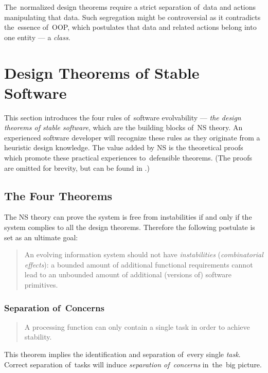 \documentclass[thesis=M,english,hidelinks]{FITthesis}[2012/10/20]
\begin{document}
The~normalized design theorems require a strict separation of~data and actions manipulating that data. Such segregation might be controversial as it contradicts the~essence of~\acrfull{OOP}, which postulates that data and related actions belong into one entity --- a \textit{class}.

% 
% 
\section{Design Theorems of Stable Software}
\label{sec:theorems}
This section introduces the four rules of~software evolvability --- \textit{the design theorems of stable software}, which are the building blocks of~\acrshort{NS} theory. An experienced software developer will recognize these rules as they originate from a heuristic design knowledge. The value added by \acrshort{NS} is the theoretical proofs which promote these practical experiences to~defensible theorems. (The proofs are omitted for brevity, but can be found in \cite{ns-recreating, ns-toward-general-theory}.)

\subsection{The Four Theorems}
The \acrshort{NS} theory can prove the system is free from instabilities if and only if the system complies to all the design theorems. Therefore the following postulate is set as an ultimate goal:
\begin{quote}
    An evolving information system should not have \textit{instabilities} (\textit{combinatorial effects}): a bounded amount of additional functional requirements cannot lead to an unbounded amount of additional (versions of) software primitives.~\cite{ns-toward-general-theory}
\end{quote}

\subsubsection{Separation of~Concerns}
\begin{quote}
A processing function can only contain a single task in order to achieve stability.~\cite{ns-toward-general-theory}
\end{quote}

This theorem implies the identification and separation of~every single \textit{task}. Correct separation of~tasks will induce \emph{separation of~concerns} in~the~big picture.
\end{document}
